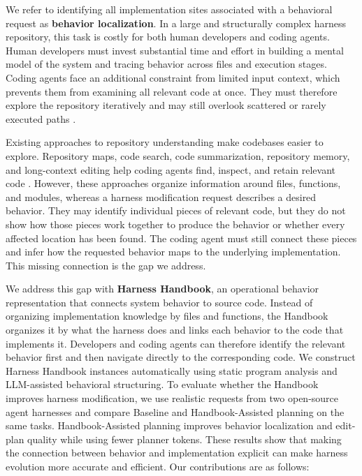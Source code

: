 \documentclass[]{ailab}
\begin{document}
We refer to identifying all implementation sites associated with a behavioral
request as \textbf{behavior localization}. In a large and structurally complex
harness repository, this task is costly for both human developers and coding
agents. Human developers must invest substantial time and effort in building a
mental model of the system and tracing behavior across files and execution
stages. Coding agents face an additional constraint from limited input context,
which prevents them from examining all relevant code at once. They must
therefore explore the repository iteratively and may still overlook scattered or
rarely executed paths \citep{zhang2026swe,tamoyan2026sherloc}.

Existing approaches to repository understanding make codebases easier to
explore. Repository maps, code search, code summarization, repository memory, and
long-context editing help coding agents find, inspect, and retain relevant code
\citep{zhang2026swe,bhola2026code,wang2025improving,tamoyan2026sherloc,cao2026coding}.
However, these approaches organize information around files, functions, and
modules, whereas a harness modification request describes a desired behavior.
They may identify individual pieces of relevant code, but they do not show how
those pieces work together to produce the behavior or whether every affected
location has been found. The coding agent must still connect these pieces and
infer how the requested behavior maps to the underlying implementation. This
missing connection is the gap we address.

We address this gap with \textbf{Harness Handbook}, an operational behavior
representation that connects system behavior to source code. Instead of
organizing implementation knowledge by files and functions, the Handbook
organizes it by what the harness does and links each behavior to the code that
implements it. Developers and coding agents can therefore identify the relevant
behavior first and then navigate directly to the corresponding code. We
construct Harness Handbook instances automatically using static program analysis
and LLM-assisted behavioral structuring. To evaluate whether the Handbook
improves harness modification, we use realistic requests from two open-source
agent harnesses and compare Baseline and Handbook-Assisted planning on the same
tasks. Handbook-Assisted planning improves behavior localization and edit-plan
quality while using fewer planner tokens. These results show that making the
connection between behavior and implementation explicit can make harness
evolution more accurate and efficient. Our contributions are as follows:
\end{document}
